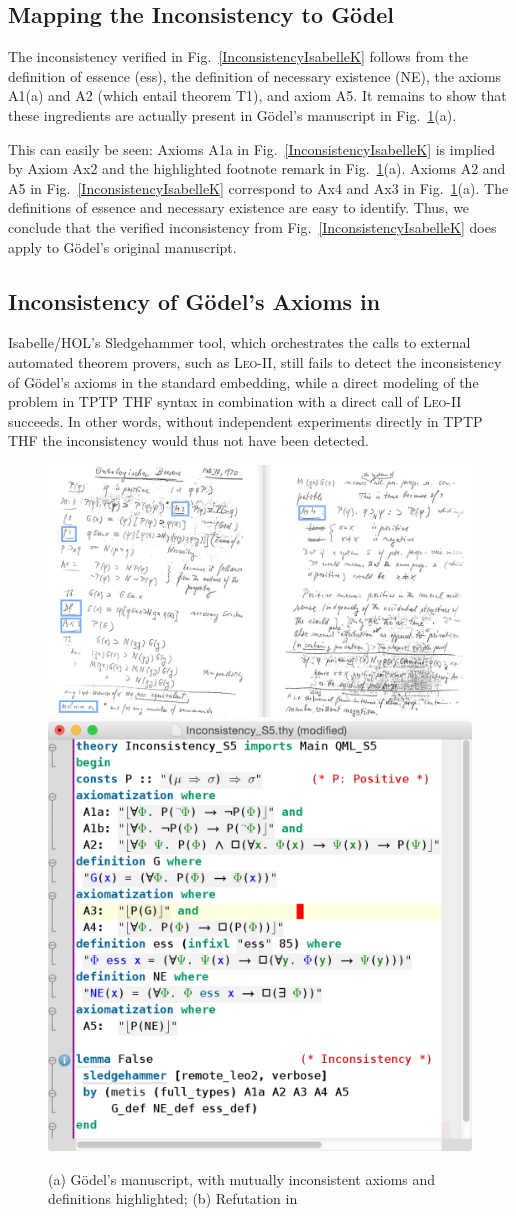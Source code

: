 \documentclass{article}
\begin{document}
\subsection{Mapping the Inconsistency to G\"odel}
The inconsistency verified in Fig.~\ref{InconsistencyIsabelleK} follows from the definition of
essence (ess), the definition of necessary existence (NE), the
axioms A1(a) and A2 (which entail theorem T1), and axiom A5. It remains to show that
these ingredients are actually present in G\"odel's manuscript in
Fig.~\ref{GoedelScript}(a). 

This can easily be seen: Axioms A1a in
Fig.~\ref{InconsistencyIsabelleK} is implied by Axiom Ax2 and the
highlighted footnote remark in Fig.~\ref{GoedelScript}(a). Axioms A2 and
A5 in Fig.~\ref{InconsistencyIsabelleK} correspond to Ax4 and Ax3 in
Fig.~\ref{GoedelScript}(a). The definitions of essence and necessary
existence are easy to identify. Thus, we conclude that the verified
inconsistency from Fig.~\ref{InconsistencyIsabelleK} does apply to 
G\"odel's original manuscript.

\subsection{Inconsistency of G\"odel's Axioms in \SFiveU}

Isabelle/HOL's Sledgehammer tool, which orchestrates the calls to
external automated theorem provers, such as \textsc{Leo-II}, still
fails to detect the inconsistency of G\"odel's axioms in the standard
embedding, while a direct modeling of the problem in TPTP THF syntax
in combination with a direct call of \textsc{Leo-II} succeeds. In
other words, without independent experiments directly in TPTP THF the
inconsistency would thus not have been detected.
\begin{figure}
\centerline{
\includegraphics[width=.65\textwidth]{./Images/Manuscript2.png} \hfill
\includegraphics[width=.35\textwidth]{./Images/Inconsistency_S5U_direct.png}
}
\caption{(a) G\"{o}del's manuscript, with mutually inconsistent axioms and
  definitions highlighted; (b) Refutation in
\SFiveU} \label{Inconsistency_S5U} \label{GoedelScript} 
\end{figure}
\end{document}
